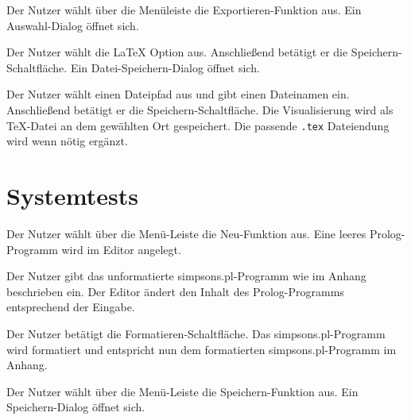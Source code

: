 \documentclass[parskip=full,11pt,twoside]{scrartcl}
\begin{document}


{Der Nutzer wählt über die Menüleiste die Exportieren-Funktion aus.}
{Ein Auswahl-Dialog öffnet sich.}

{Der Nutzer wählt die LaTeX Option aus. Anschließend betätigt er die Speichern-Schaltfläche.}
{Ein Datei-Speichern-Dialog öffnet sich.}

{Der Nutzer wählt einen Dateipfad aus und gibt einen Dateinamen ein. Anschließend betätigt er die Speichern-Schaltfläche.}
{Die Visualisierung wird als TeX-Datei an dem gewählten Ort gespeichert. Die passende \texttt{.tex} Dateiendung wird wenn nötig ergänzt.}


\newpage
\section{Systemtests}


{Der Nutzer wählt über die Menü-Leiste die Neu-Funktion aus.}
{Eine leeres Prolog-Programm wird im Editor angelegt.}

{Der Nutzer gibt das unformatierte simpsons.pl-Programm wie im Anhang beschrieben ein.}
{Der Editor ändert den Inhalt des Prolog-Programms entsprechend der Eingabe.}

{Der Nutzer betätigt die Formatieren-Schaltfläche.}
{Das simpsons.pl-Programm wird formatiert und entspricht nun dem formatierten simpsons.pl-Programm im Anhang.}

{Der Nutzer wählt über die Menü-Leiste die Speichern-Funktion aus.}
{Ein Speichern-Dialog öffnet sich.}
\end{document}
